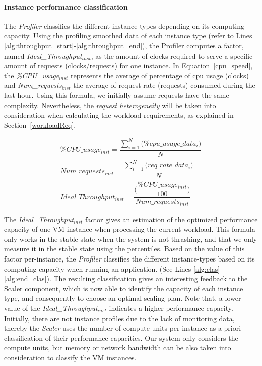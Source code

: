 \paragraph{Instance performance classification} The \emph{Profiler} classifies the different instance types depending on its computing capacity. Using the profiling smoothed data of each instance type (refer to Lines \ref{alg:throughput_start}-\ref{alg:throughput_end}), the Profiler computes a factor, named \emph{Ideal\_Throughput$_{inst}$}, as the amount of clocks required to serve a specific amount of requests (clocks/requests)  for one instance. In Equation~\ref{cpu_speed}, the \emph{\%CPU\_usage$_{inst}$} represents the average of percentage of cpu usage (clocks) and \emph{Num\_requests$_{inst}$} the average of request rate (requests) consumed during the last hour. Using this formula, we initially assume requests have the same complexity. Nevertheless, the \emph{request heterogeneity} will be taken into consideration when calculating the workload requirements, as explained in Section~\ref{workloadReq}.



{\scriptsize
\begin{equation}\label{cpu_speed}
\begin{split}
\% CPU\_usage_{inst} = \dfrac{   \sum_{i=1}^N \big( \% cpu\_usage\_data_{i}  \big) } { N } \\
Num\_requests_{inst} = \dfrac{   \sum_{i=1}^N \big( req\_rate\_data_{i} \big) } { N } \\
Ideal\_Throughput_{inst} =\dfrac{ \bigg( \dfrac{\% CPU\_usage_{inst} } { 100 }  \bigg) } {  Num\_requests_{inst}   } 
\end{split}
\end{equation}
}

The \emph{Ideal\_Throughput$_{inst}$} factor gives an estimation of the optimized performance capacity of one VM instance when processing the current workload. This formula only works in the stable state when the system is not thrashing, and that we only measure it in the stable state using the percentiles. Based on the value of this factor per-instance, the \emph{Profiler} classifies the different instance-types based on its computing capacity when running an application. (See Lines \ref{alg:clas}-\ref{alg:end_clas}). The resulting classification gives an interesting feedback to the Scaler component, which is now able to identify the capacity of each instance type, and consequently to choose an optimal scaling plan. Note that, a lower value of the \emph{Ideal\_Throughput$_{inst}$} indicates a higher performance capacity. Initially, there are not instance profiles due to the lack of monitoring data, thereby the \emph{Scaler} uses the number of compute units per instance as a priori classification of their performance capacities. Our system only considers the compute units, but memory or network bandwidth can be also taken into consideration to classify the VM instances.

